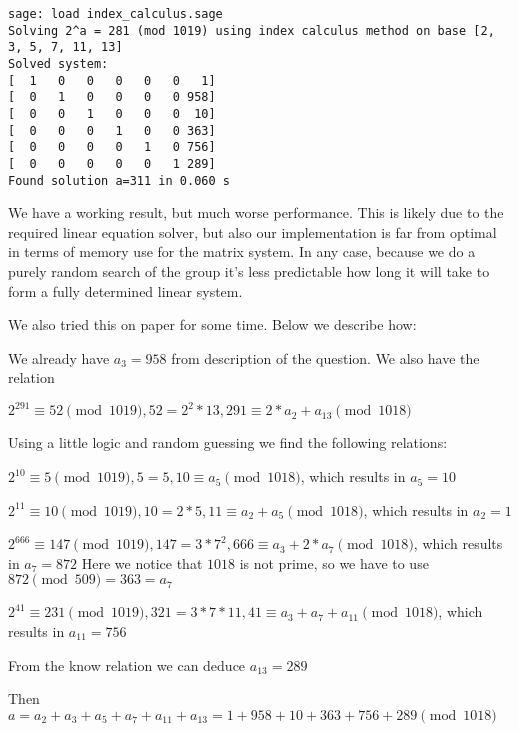 \documentclass{article}
\begin{document}
\begin{verbatim}
sage: load index_calculus.sage
Solving 2^a = 281 (mod 1019) using index calculus method on base [2, 3, 5, 7, 11, 13]
Solved system:
[  1   0   0   0   0   0   1]
[  0   1   0   0   0   0 958]
[  0   0   1   0   0   0  10]
[  0   0   0   1   0   0 363]
[  0   0   0   0   1   0 756]
[  0   0   0   0   0   1 289]
Found solution a=311 in 0.060 s
\end{verbatim}

We have a working result, but much worse performance.
This is likely due to the required linear equation solver, but also our implementation is far from optimal in terms of memory use for the matrix system.
In any case, because we do a purely random search of the group it's less predictable how long it will take to form a fully determined linear system.

We also tried this on paper for some time. Below we describe how:

We already have $a_3 = 958$ from description of the question. We also have the relation 

$2^{291} \equiv 52 \pmod{1019}, 52 = 2^2 * 13, 291 \equiv 2*a_2 + a_{13} \pmod{1018} $

Using a little logic and random guessing we find the following relations:

$2^{10} \equiv 5 \pmod{1019}, 5 = 5, 10 \equiv a_{5} \pmod{1018} $, which results in $a_5 = 10$

$2^{11} \equiv 10 \pmod{1019}, 10 = 2*5, 11 \equiv a_2 + a_{5} \pmod{1018} $, which results in $a_2 = 1$

$2^{666} \equiv 147 \pmod{1019}, 147 = 3*7^2, 666 \equiv a_3 + 2*a_{7} \pmod{1018} $, which results in $a_7 = 872$
Here we notice that $1018$ is not prime, so we have to use $872 \pmod{509} = 363 = a_7$

$2^{41} \equiv 231 \pmod{1019}, 321 = 3*7*11, 41 \equiv a_3 + a_7 + a_11 \pmod{1018} $, which results in $a_11 = 756$

From the know relation we can deduce $a_{13} = 289$

Then $a = a_2+a_3+a_5+a_7+a_{11}+a_{13} = 1 + 958 + 10 + 363 + 756 + 289 \pmod{1018}$
\end{document}

